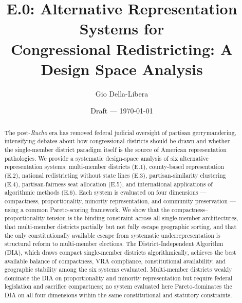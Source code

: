 \documentclass[12pt]{article}
\title{E.0: Alternative Representation Systems for\\
       Congressional Redistricting: A Design Space Analysis}
\author{Gio Della-Libera}
\date{Draft --- \today}
\begin{document}
\maketitle

\begin{abstract}
The post-\emph{Rucho} era has removed federal judicial oversight of partisan
gerrymandering, intensifying debates about how congressional districts should be
drawn and whether the single-member district paradigm itself is the source of
American representation pathologies.  We provide a systematic design-space
analysis of six alternative representation systems: multi-member districts
(E.1), county-based representation (E.2), national redistricting without state
lines (E.3), partisan-similarity clustering (E.4), partisan-fairness seat
allocation (E.5), and international applications of algorithmic methods (E.6).
Each system is evaluated on four dimensions --- compactness, proportionality,
minority representation, and community preservation --- using a common
Pareto-scoring framework.  We show that the compactness--proportionality
tension is the binding constraint across all single-member architectures, that
multi-member districts partially but not fully escape geographic sorting, and
that the only constitutionally available escape from systematic
underrepresentation is structural reform to multi-member elections.  The
District-Independent Algorithm (DIA), which draws compact single-member
districts algorithmically, achieves the best available balance of compactness,
VRA compliance, constitutional availability, and geographic stability among the
six systems evaluated.  Multi-member districts weakly dominate the DIA on
proportionality and minority representation but require federal legislation and
sacrifice compactness; no system evaluated here Pareto-dominates the DIA on all
four dimensions within the same constitutional and statutory constraints.
\end{abstract}










\end{document}
